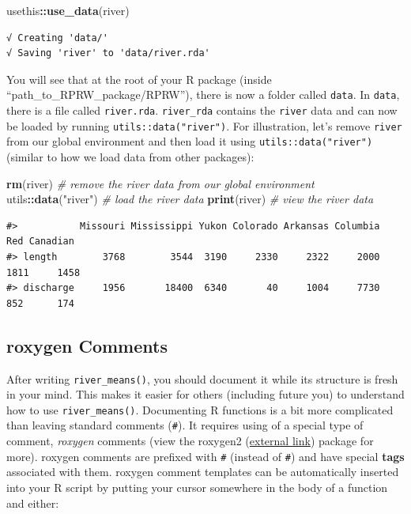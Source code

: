 \documentclass[
]{book}
\newenvironment{Shaded}{\begin{snugshade}}{\end{snugshade}}
\newcommand{\CommentTok}[1]{\textcolor[rgb]{0.56,0.35,0.01}{\textit{#1}}}
\newcommand{\KeywordTok}[1]{\textcolor[rgb]{0.13,0.29,0.53}{\textbf{#1}}}
\newcommand{\NormalTok}[1]{#1}
\newcommand{\OperatorTok}[1]{\textcolor[rgb]{0.81,0.36,0.00}{\textbf{#1}}}
\newcommand{\StringTok}[1]{\textcolor[rgb]{0.31,0.60,0.02}{#1}}
\begin{document}
\begin{Shaded}
\begin{Highlighting}[]
\NormalTok{usethis}\OperatorTok{::}\KeywordTok{use_data}\NormalTok{(river)}
\end{Highlighting}
\end{Shaded}

\begin{verbatim}
√ Creating 'data/'
√ Saving 'river' to 'data/river.rda'
\end{verbatim}

You will see that at the root of your R package (inside ``path\_to\_RPRW\_package/RPRW''), there is now a folder called \texttt{data}. In \texttt{data}, there is a file called \texttt{river.rda}. \texttt{river\_rda} contains the \texttt{river} data and can now be loaded by running \texttt{utils::data("river")}. For illustration, let's remove \texttt{river} from our global environment and then load it using \texttt{utils::data("river")} (similar to how we load data from other packages):

\begin{Shaded}
\begin{Highlighting}[]
\KeywordTok{rm}\NormalTok{(river) }\CommentTok{# remove the river data from our global environment}
\NormalTok{utils}\OperatorTok{::}\KeywordTok{data}\NormalTok{(}\StringTok{"river"}\NormalTok{) }\CommentTok{# load the river data}
\KeywordTok{print}\NormalTok{(river) }\CommentTok{# view the river data}
\end{Highlighting}
\end{Shaded}

\begin{verbatim}
#>           Missouri Mississippi Yukon Colorado Arkansas Columbia  Red Canadian
#> length        3768        3544  3190     2330     2322     2000 1811     1458
#> discharge     1956       18400  6340       40     1004     7730  852      174
\end{verbatim}

\hypertarget{roxygen}{%
\subsection{roxygen Comments}\label{roxygen}}

After writing \texttt{river\_means()}, you should document it while its structure is fresh in your mind. This makes it easier for others (including future you) to understand how to use \texttt{river\_means()}. Documenting R functions is a bit more complicated than leaving standard comments (\texttt{\#}). It requires using of a special type of comment, \emph{roxygen} comments (view the roxygen2 (\href{https://roxygen2.r-lib.org/}{external link}) package for more). roxygen comments are prefixed with \texttt{\#\textquotesingle{}} (instead of \texttt{\#}) and have special \textbf{tags} associated with them. roxygen comment templates can be automatically inserted into your R script by putting your cursor somewhere in the body of a function and either:
\end{document}
